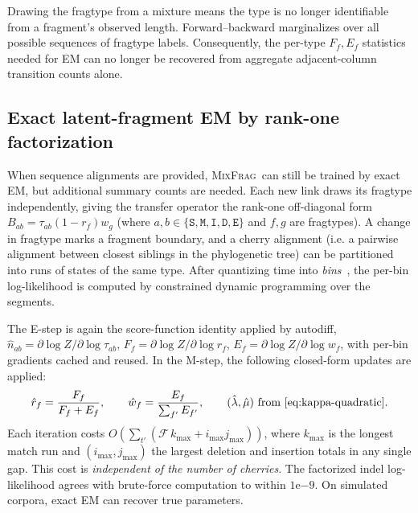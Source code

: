 \documentclass{article}
\newcommand{\MixFrag}{\textsc{MixFrag}}
\newcommand{\ins}{\lambda}
\newcommand{\del}{\mu}
\newcommand{\hst}[1]{\texttt{#1}}
\begin{document}
Drawing the fragtype from a mixture means the type is no longer identifiable 
from a fragment's observed length. Forward--backward marginalizes
over all possible sequences of fragtype labels. Consequently, the per-type
$F_f,E_f$ statistics needed for EM can no longer be recovered from 
aggregate adjacent-column transition counts alone.

\subsection{Exact latent-fragment EM by rank-one factorization}
\label{sec:cherryem}

When sequence alignments are provided, \MixFrag\ can still be trained by 
exact EM, but additional summary counts are needed. 
Each new link draws its fragtype independently, giving the 
transfer operator the rank-one off-diagonal form $B_{ab}=\tau_{ab}(1-r_f)w_g$ (where $a,b \in \{ \hst{S}, \hst{M}, \hst{I}, \hst{D}, \hst{E} \}$ and $f,g$ are fragtypes). 
A change in fragtype marks a fragment boundary, and a cherry alignment (i.e. a pairwise alignment between closest siblings in the phylogenetic tree) can be
partitioned into runs of states of the same type. After quantizing time into \textit{bins}~\cite{Prillo2022CherryML}, the per-bin log-likelihood is
computed by constrained dynamic programming over the segments.

The E-step is again the score-function identity applied by
autodiff, $\hat n_{ab}=\partial\log Z/\partial\log\tau_{ab}$,
$F_f=\partial\log Z/\partial\log r_f$,
$E_f=\partial\log Z/\partial\log w_f$, with per-bin gradients cached and
reused. 
In the M-step, the following closed-form updates are applied:
\begin{equation}
\label{eq:mixfrag-mstep}
\hat r_f=\frac{F_f}{F_f+E_f},\qquad
\hat w_f=\frac{E_f}{\sum_{f'}E_{f'}},\qquad
(\hat\ins,\hat\del)\ \text{from \Cref{eq:kappa-quadratic}} .
\end{equation}
Each iteration costs $O(\sum_{t'}(\mathcal F\,k_{\max}+i_{\max}j_{\max}))$, where $k_{\max}$ is 
the longest match run and $(i_{\max},j_{\max})$ the largest deletion and insertion totals in any 
single gap. This cost is \emph{independent of the number of cherries}. The factorized indel 
log-likelihood agrees with brute-force computation to within $1\mathrm{e}{-9}$. On simulated 
corpora, exact EM can recover true parameters.
\end{document}
